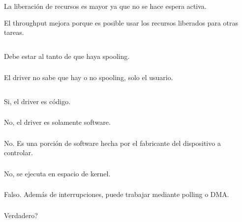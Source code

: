 La liberación de recursos es mayor ya que no se hace espera activa.

El throughput mejora porque es posible usar los recursos liberados para otras
tareas.

\subsection{}

\subsubsection{}
Debe estar al tanto de que haya spooling.

\subsubsection{}
El driver no sabe que hay o no spooling, solo el usuario.

\subsection{}

\subsubsection{}
Si, el driver es código.

\subsubsection{}
No, el driver es solamente software.

\subsubsection{}
No. Es una porción de software hecha por el fabricante del dispositivo a
controlar.

\subsubsection{}
No, se ejecuta en espacio de kernel.

\subsubsection{}
Falso. Además de interrupciones, puede trabajar mediante polling o DMA.

\subsubsection{}
Verdadero?

